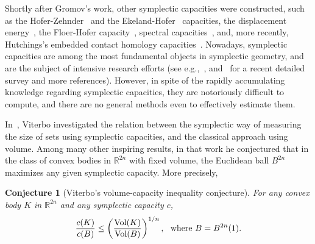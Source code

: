 \documentclass{icmart}
\newtheorem{conjecture}[theorem]{Conjecture}
\theoremstyle{definition}
\begin{document}
Shortly after Gromov's work, other symplectic capacities were constructed,
such as the Hofer-Zehnder~\cite{HZ} and the Ekeland-Hofer~\cite{EH} capacities, the displacement energy~\cite{H},  the Floer-Hofer capacity~\cite{FH,FHW},
spectral capacities~\cite{FGS,Oh,V1}, and, more recently, Hutchings's embedded contact homology capacities~\cite{Hu1}.
Nowadays, symplectic capacities are among the most fundamental objects in symplectic geometry,
and are the subject of intensive research efforts (see e.g.,~\cite{Hu2,IrirKei1, L, LMT, LMS, Lu, Mcd2,McSch,Schle}, and~\cite{CHLS} for a recent detailed survey and more references).
 However, in spite of the rapidly accumulating
knowledge regarding symplectic capacities, they are %
notoriously difficult
 to compute, and
there are no general methods even to effectively estimate them.
% 

\smallskip







In~\cite{V}, Viterbo investigated the relation between the
symplectic way of measuring the size of sets using symplectic
capacities, and the classical  approach using  volume. Among many other inspiring results, in that work he
conjectured that in the class of convex bodies in ${\mathbb R}^{2n}$
with fixed volume, the Euclidean ball $B^{2n}$ maximizes any
given symplectic capacity. More precisely,


\begin{conjecture}[Viterbo's volume-capacity inequality conjecture] \label{iso-per-conj} For
any convex body $K $ in ${\mathbb R}^{2n}$ and any symplectic
capacity $c$,
\begin{equation*} \label{AAMO-result} {\frac {c(K)} {c(B)}} \leq  \left  (   {\frac {{\rm Vol}(K)}
{{\rm Vol}(B)}} \right )^{1/n}, \ \ {\rm where} \ B = B^{2n}(1).
\end{equation*}
\end{conjecture}
\end{document}
